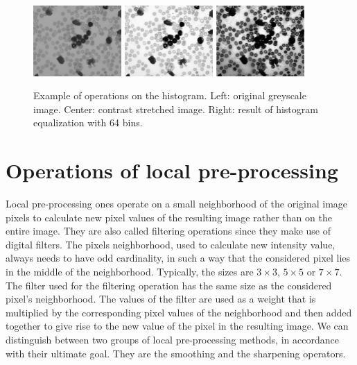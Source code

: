 \begin{figure}[!h]
	\centering
	\includegraphics[width=0.3\textwidth]{images/figContrastStretching1}
	\includegraphics[width=0.3\textwidth]{images/figContrastStretching2}
	\includegraphics[width=0.3\textwidth]{images/figHistogramEqualization}
	\caption[Example of operations on the histogram.]{\label{fig:contrastStretching} Example of operations on the histogram. Left: original greyscale image. Center: contrast stretched image. Right: result of histogram equalization with 64 bins.}
\end{figure}

\section{Operations of local pre-processing} %
Local pre-processing ones operate on a small neighborhood of the original image pixels to calculate new pixel values of the resulting image rather than on the entire image. They are also called filtering operations since they make use of digital filters. The pixels neighborhood, used to calculate new intensity value, always needs to have odd cardinality, in such a way that the considered pixel lies in the middle of the neighborhood. Typically, the sizes are $3\times3$, $5\times5$ or $7\times7$. The filter used for the filtering operation has the same size as the considered pixel's neighborhood. The values of the filter are used as a weight that is multiplied by the corresponding pixel values of the neighborhood and then added together to give rise to the new value of the pixel in the resulting image. We can distinguish between two groups of local pre-processing methods, in accordance with their ultimate goal. They are the smoothing and the sharpening operators.


